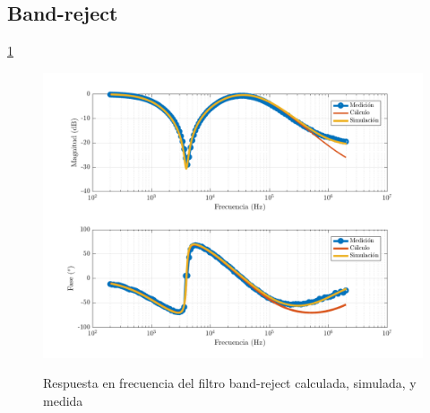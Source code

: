 \subsection{Band-reject}

\ref{fig:ej2_BR_bode}
\begin{figure}
	\includegraphics[width=\textwidth]{imagenes/BR_bode}
	\label{fig:ej2_BR_bode}
	\caption{Respuesta en frecuencia del filtro band-reject calculada, simulada, y medida}
\end{figure}

